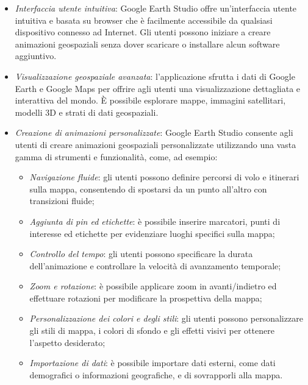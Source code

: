 \begin{itemize}
    \item \textit{Interfaccia utente intuitiva}: Google Earth Studio offre un'interfaccia utente intuitiva e basata su browser che è facilmente accessibile da qualsiasi dispositivo connesso ad Internet. Gli utenti possono iniziare a creare animazioni geospaziali senza dover scaricare o installare alcun software aggiuntivo. 
    \item \textit{Visualizzazione geospaziale avanzata}: l'applicazione sfrutta i dati di Google Earth e Google Maps per offrire agli utenti una visualizzazione dettagliata e interattiva del mondo. È possibile esplorare mappe, immagini satellitari, modelli 3D e strati di dati geospaziali. 
    \item \textit{Creazione di animazioni personalizzate}: Google Earth Studio consente agli utenti di creare animazioni geospaziali personalizzate utilizzando una vasta gamma di strumenti e funzionalità, come, ad esempio:

    \begin{itemize}
        \item \textit{Navigazione fluide}: gli utenti possono definire percorsi di volo e itinerari sulla mappa, consentendo di spostarsi da un punto all'altro con transizioni fluide;
        \item \textit{Aggiunta di pin ed etichette}: è possibile inserire marcatori, punti di interesse ed etichette per evidenziare luoghi specifici sulla mappa;
        \item \textit{Controllo del tempo}: gli utenti possono specificare la durata dell'animazione e controllare la velocità di avanzamento temporale;
        \item \textit{Zoom e rotazione}: è possibile applicare zoom in avanti/indietro ed effettuare rotazioni per modificare la prospettiva della mappa;
        \item \textit{Personalizzazione dei colori e degli stili}: gli utenti possono personalizzare gli stili di mappa, i colori di sfondo e gli effetti visivi per ottenere l'aspetto desiderato;
        \item \textit{Importazione di dati}: è possibile importare dati esterni, come dati demografici o informazioni geografiche, e di sovrapporli alla mappa.     
    \end{itemize}
     

\end{itemize}
